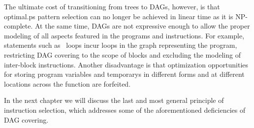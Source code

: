 The ultimate cost of transitioning from \glspl{tree} to \glspl{DAG}, however, is
that \gls{optimal.ps} \gls{pattern selection} can no longer be achieved in
linear time as it is NP-complete.
%
At the same time, \glspl{DAG} are not
expressive enough to allow the proper modeling of all aspects featured in the
\glspl{program} and \glspl{instruction}.
%
For example, statements such as
\mbox{ loops} incur \glspl{loop} in the \gls{graph} representing
the \gls{program}, restricting \gls{DAG covering} to the scope of \glspl{block}
and excluding the modeling of \glspl{inter-block instruction}.
%
Another
disadvantage is that optimization opportunities for storing \gls{program}
variables and \glspl{temporary} in different forms and at different locations
across the \gls{function} are forfeited.

In the next chapter we will discuss the last and most general \gls{principle} of
\gls{instruction selection}, which addresses some of the aforementioned
deficiencies of \gls{DAG covering}.
